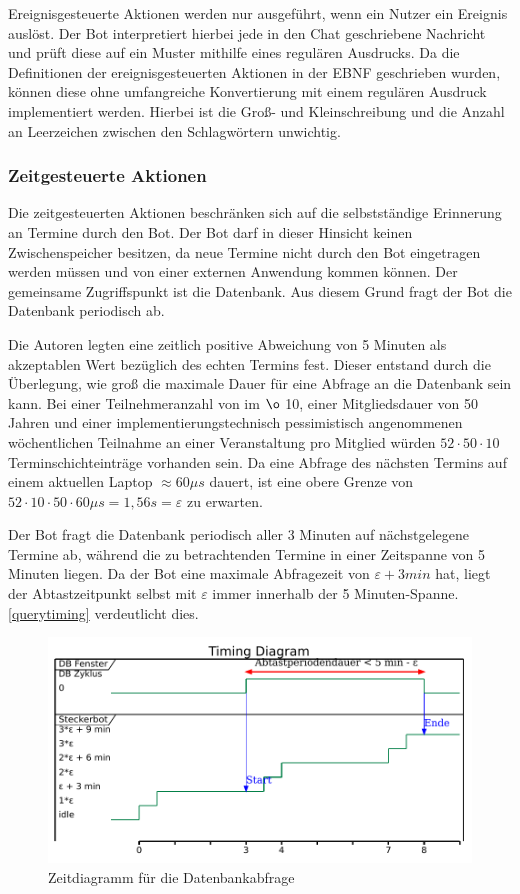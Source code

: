 Ereignisgesteuerte Aktionen werden nur ausgeführt, wenn ein Nutzer ein Ereignis auslöst. Der Bot interpretiert hierbei jede in den Chat geschriebene Nachricht und prüft diese auf ein Muster mithilfe eines regulären Ausdrucks. Da die Definitionen der ereignisgesteuerten Aktionen in der EBNF geschrieben wurden, können diese ohne umfangreiche Konvertierung mit einem regulären Ausdruck implementiert werden. Hierbei ist die Groß- und Kleinschreibung und die Anzahl an Leerzeichen zwischen den Schlagwörtern unwichtig.

\subsubsection{Zeitgesteuerte Aktionen}

Die zeitgesteuerten Aktionen beschränken sich auf die selbstständige Erinnerung an Termine durch den Bot. Der Bot darf in dieser Hinsicht keinen Zwischenspeicher besitzen, da neue Termine nicht durch den Bot eingetragen werden müssen und von einer externen Anwendung kommen können. Der gemeinsame Zugriffspunkt ist die Datenbank. Aus diesem Grund fragt der Bot die Datenbank periodisch ab.

Die Autoren legten eine zeitlich positive Abweichung von 5 Minuten als akzeptablen Wert bezüglich des echten Termins fest. Dieser entstand durch die Überlegung, wie groß die maximale Dauer für eine Abfrage an die Datenbank sein kann. Bei einer Teilnehmeranzahl von im $\o$ 10, einer Mitgliedsdauer von 50 Jahren und einer implementierungstechnisch pessimistisch angenommenen wöchentlichen Teilnahme an einer Veranstaltung pro Mitglied würden $52 \cdot 50 \cdot 10$ Terminschichteinträge vorhanden sein. Da eine Abfrage des nächsten Termins auf einem aktuellen Laptop $\approx 60\mu s$ dauert, ist eine obere Grenze von $52 \cdot 10 \cdot 50 \cdot 60 \mu s=1,56s=\varepsilon $ zu erwarten.

Der Bot fragt die Datenbank periodisch aller 3 Minuten auf nächstgelegene Termine ab, während die zu betrachtenden Termine in einer Zeitspanne von 5 Minuten liegen. Da der Bot eine maximale Abfragezeit von $\varepsilon + 3min$ hat, liegt der Abtastzeitpunkt selbst mit $\varepsilon$ immer innerhalb der 5 Minuten-Spanne. \autoref{querytiming} verdeutlicht dies.
 
\begin{figure}[htbp]
	\centering
	\includegraphics[width=1\textwidth,clip]{img/query.pdf}
	\caption{Zeitdiagramm für die Datenbankabfrage}
	\label{querytiming}
\end{figure}


